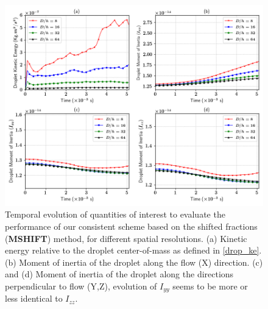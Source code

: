 \begin{figure}
\begin{center}
\includegraphics[width = 1.5\textwidth]{plots/raindrop/multiplot_raindrop.png}
\end{center}
\vspace*{-0.5cm}
\caption{Temporal evolution of quantities of interest to evaluate the 
	performance of our consistent scheme based on the 
	shifted fractions (\textbf{MSHIFT}) method, for different spatial resolutions. 
	(a) Kinetic energy relative to the droplet center-of-mass as defined in \eqref{drop_ke}. 
	(b) Moment of inertia of the droplet along the flow (X) direction. 
	(c) and (d) Moment of inertia of the droplet along the directions 
	perpendicular to flow (Y,Z), evolution of $I_{yy}$ 
	seems to be more or less identical to $I_{zz}$.}
\label{multi_caf}
\end{figure}


